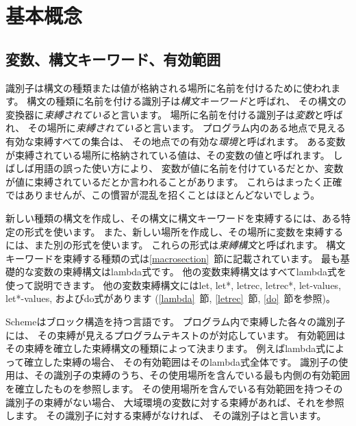 \chapter{基本概念}
\label{basicchapter}

\section{変数、構文キーワード、有効範囲}
\label{specialformsection}
\label{variablesection}

識別子は構文の種類または値が格納される場所に名前を付けるために使われます。
構文の種類に名前を付ける識別子は{\em 構文キーワード}と呼ばれ、
その構文の変換器に{\em 束縛されている}と言います。
場所に名前を付ける識別子は{\em 変数}と呼ばれ、
その場所に{\em 束縛されている}と言います。
プログラム内のある地点で見える有効な束縛すべての集合は、
その地点での有効な{\em 環境}と呼ばれます。
ある変数が束縛されている場所に格納されている値は、その変数の値と呼ばれます。
しばしば用語の誤った使い方により、
変数が値に名前を付けているだとか、変数が値に束縛されているだとか言われることがあります。
これらはまったく正確ではありませんが、この慣習が混乱を招くことはほとんどないでしょう。

\vest 新しい種類の構文を作成し、その構文に構文キーワードを束縛するには、ある特定の形式を使います。
また、新しい場所を作成し、その場所に変数を束縛するには、また別の形式を使います。
これらの形式は{\em 束縛構文}と呼ばれます。
構文キーワードを束縛する種類の式は\ref{macrosection}~節に記載されています。
最も基礎的な変数の束縛構文は{\cf lambda}式です。
他の変数束縛構文はすべて{\cf lambda}式を使って説明できます。
他の変数束縛構文には{\cf let}, {\cf let*}, {\cf letrec},
{\cf letrec*}, {\cf let-values}, {\cf let*-values},
および{\cf do}式があります
(\ref{lambda}~節, \ref{letrec}~節, \ref{do}~節を参照)。


\vest Schemeはブロック構造を持つ言語です。
プログラム内で束縛した各々の識別子には、
その束縛が見えるプログラムテキストのが対応しています。
有効範囲はその束縛を確立した束縛構文の種類によって決まります。
例えば{\cf lambda}式によって確立した束縛の場合、
その有効範囲はその{\cf lambda}式全体です。
識別子の使用は、その識別子の束縛のうち、その使用場所を含んでいる最も内側の有効範囲を確立したものを参照します。
その使用場所を含んでいる有効範囲を持つその識別子の束縛がない場合、
大域環境の変数に対する束縛があれば、それを参照します。
その識別子に対する束縛がなければ、
その識別子はと言います。

